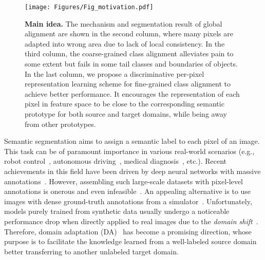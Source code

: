 \documentclass[runningheads]{llncs}
\begin{document}
\begin{figure*}
    \centering
    \texttt{[image: Figures/Fig\_motivation.pdf]}\caption{{\bf Main idea.} The mechanism and segmentation result of global alignment are shown in the second column, where many pixels are adapted into wrong area due to lack of local consistency. In the third column, the coarse-grained class alignment alleviates pain to some extent but fails in some tail classes and boundaries of objects. In the last column, we propose a discriminative per-pixel representation learning scheme for fine-grained class alignment to achieve better performance. It encourages the representation of each pixel in feature space to be close to the corresponding semantic prototype for both source and target domains, while being away from other prototypes.}\vspace{-4mm}
    \label{Fig_motivation}
\end{figure*}

Semantic segmentation aims to assign a semantic label to each pixel of an image. This task can be of paramount importance in various real-world scenarios (e.g., robot control~\cite{robot_control2,robot_control1}, autonomous driving~\cite{geiger2012autonomous,zhou2020autonomous}, medical diagnosis~\cite{chaitanya2020medical,ronneberger2015UNet}, etc.). Recent achievements in this field have been driven by deep neural networks with massive annotations~\cite{chen2018encoderdecoder,ZhenLZSFFQ20}. However, assembling such large-scale datasets with pixel-level annotations is onerous and even infeasible~\cite{Cordts2016Cityscapes}. An appealing alternative is to use images with dense ground-truth annotations from a simulator~\cite{stephan2016gtav,ros2016synthia}. Unfortunately, models purely trained from synthetic data usually undergo a noticeable performance drop when directly applied to real images due to the \textit{domain shift}~\cite{dataset_shift_in_ML09}. 
Therefore, domain adaptation (DA)~\cite{david2010theory,gong2012geodesic,lv2021pareto,ganin2015dann,YueZZ0DKS21,pan2010survey,pan2019transferrable,tsai2019domain,DICD,xie2021active,zou2019confidence,TSA} has become a promising direction, whose purpose is to facilitate the knowledge learned from a well-labeled source domain better transferring to another unlabeled target domain. 
\end{document}
